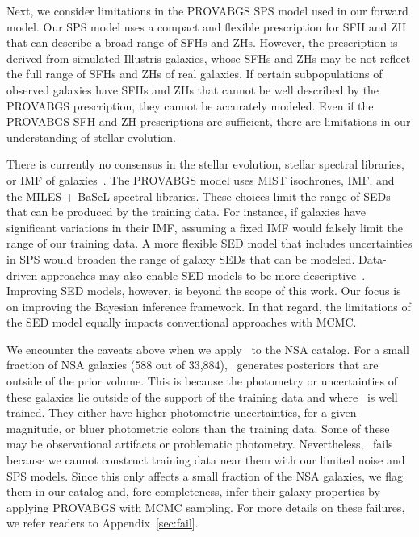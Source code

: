 Next, we consider limitations in the PROVABGS SPS model used in our forward
model. 
Our SPS model uses a compact and flexible prescription for SFH and ZH that can
describe a broad range of SFHs and ZHs.
However, the prescription is derived from simulated Illustris galaxies, whose
SFHs and ZHs may be not reflect the full range of SFHs and ZHs of real
galaxies.
If certain subpopulations of observed galaxies have SFHs and ZHs that cannot be
well described by the PROVABGS prescription, they cannot be accurately modeled.
Even if the PROVABGS SFH and ZH prescriptions are sufficient, there are
limitations in our understanding of stellar evolution. 

There is currently no consensus in the stellar evolution, stellar spectral
libraries, or IMF of galaxies~\citep[\emph{e.g.}][]{treu2010, vandokkum2010,
rosani2018, ge2019, sonnenfeld2019}.
The PROVABGS model uses MIST isochrones, \cite{chabrier2003} IMF, and the MILES
+ BaSeL spectral libraries. 
These choices limit the range of SEDs that can be produced by the training
data. 
For instance, if galaxies have significant variations in their IMF, assuming a
fixed IMF would falsely limit the range of our training data.  
A more flexible SED model that includes uncertainties in SPS would broaden the
range of galaxy SEDs that can be modeled.
Data-driven approaches may also enable SED models to be more
descriptive~\citep[\emph{e.g.}][]{hogg2016, portillo2020}. 
Improving  SED models, however, is beyond the scope of this work. 
Our focus is on improving the Bayesian inference framework.
In that regard, the limitations of the SED model equally impacts conventional
approaches with MCMC. 

We encounter the caveats above when we apply \sedflow~to the NSA catalog. 
For a small fraction of NSA galaxies (588 out of 33,884), \sedflow~generates
posteriors that are outside of the prior volume. 
This is because the photometry or uncertainties of these galaxies lie outside
of the support of the training data and where \sedflow~is well trained. 
They either have higher photometric uncertainties, for a given magnitude, or
bluer photometric colors than the training data. 
Some of these may be observational artifacts or problematic photometry.
Nevertheless, \sedflow~fails because we cannot construct training data near
them with our limited noise and SPS models. 
Since this only affects a small fraction of the NSA galaxies, we flag them in
our catalog and, fore completeness, infer their galaxy properties by applying
PROVABGS with MCMC sampling.
For more details on these failures, we refer readers to
Appendix~\ref{sec:fail}.

